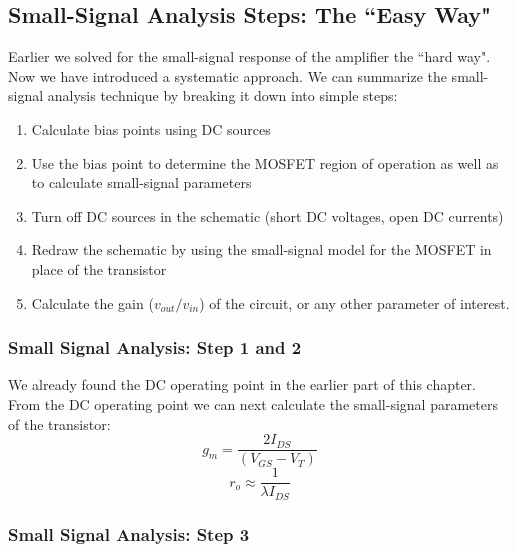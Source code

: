 \subsection{Small-Signal Analysis Steps:  The ``Easy Way"}

Earlier we solved for the small-signal response of the amplifier the ``hard way".  Now we have introduced a systematic approach.  We can summarize the small-signal analysis technique by breaking it down into simple steps:

\begin{enumerate}

	\item  Calculate bias points using DC sources

	\item  Use the bias point to determine the MOSFET region of operation as well as to calculate small-signal parameters

	\item  Turn off DC sources in the schematic (short DC voltages, open DC currents)

	\item  Redraw the schematic by using the small-signal model for the MOSFET in place of the transistor
	
	\item  Calculate the gain ($v_{out}/v_{in}$) of the circuit, or any other parameter of interest.
\end{enumerate}





\subsubsection{Small Signal Analysis:  Step 1 and 2}

We already found the DC operating point in the earlier part of this chapter.  From the DC operating point we can next calculate the small-signal parameters of the transistor:
%
\begin{equation}
	{g_m} = \frac{{2{I_{DS}}}}{{({V_{GS}} - {V_T})}}
\end{equation}
%
\begin{equation}
	{r_o} \approx \frac{1}{{\lambda {I_{DS}}}}
\end{equation}




\subsubsection{Small Signal Analysis:  Step 3}


